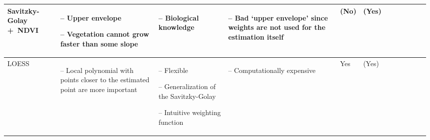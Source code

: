 \begin{table}[!ht]
\begin{tabular}{p{1.6cm}p{3.3cm}p{3.3cm}p{3.4cm}p{0.4cm}p{0.4cm}p{3cm}p{3cm}p{3cm}p{3cm}p{2.7cm}p{3cm}|}
		Savitzky-Golay  +~NDVI                                                                                                                                                    &
		\begin{cptitemize} \item[--]  Upper envelope \item[--]  Vegetation cannot grow faster than some slope                                \end{cptitemize}        &
		\begin{cptitemize} \item[--]  Biological knowledge                                                                            \end{cptitemize}               &
		\begin{cptitemize} \item[--]  Bad `upper envelope' since weights are not used for the estimation itself                    \end{cptitemize}               &
		(No)                                                                                                                                                         &
		(Yes)                                                                                                                                                         \\ \hline%

		LOESS                                                                                                                                                        &
		\begin{cptitemize} \item[--]  Local  polynomial with points closer to the estimated point are more important                  \end{cptitemize}               &
		\begin{cptitemize} \item[--]  Flexible \item[--]  Generalization of the Savitzky-Golay \item[--] Intuitive weighting function                   \end{cptitemize} &
		\begin{cptitemize} \item[--]  Computationally expensive                                                                       \end{cptitemize}               &
		Yes                                                                                                                                                          &
		(Yes)                                                                                                                                                         \\ \hline%


\end{tabular}
\end{table}
